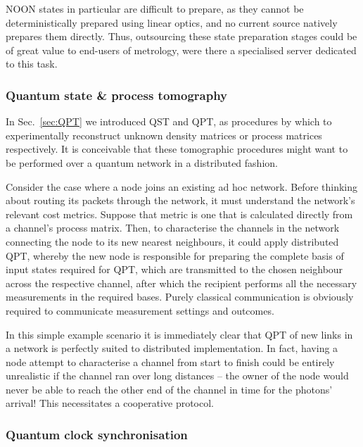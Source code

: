 \documentclass[aps, rmp, twocolumn, amsmath, amssymb, nofootinbib, superscriptaddress, longbibliography, floatfix, table-of-contents, eqsecnum]{revtex4-1}
\begin{document}
NOON states in particular are difficult to prepare, as they cannot be deterministically prepared using linear optics, and no current source natively prepares them directly. Thus, outsourcing these state preparation stages could be of great value to end-users of metrology, were there a specialised server dedicated to this task.

\cite{DomBerry}

%
%

\subsubsection{Quantum state \& process tomography}  

In Sec.~\ref{sec:QPT} we introduced QST and QPT, as procedures by which to experimentally reconstruct unknown density matrices or process matrices respectively. It is conceivable that these tomographic procedures might want to be performed over a quantum network in a distributed fashion.

Consider the case where a node joins an existing ad hoc network. Before thinking about routing its packets through the network, it must understand the network's relevant cost metrics. Suppose that metric is one that is calculated directly from a channel's process matrix. Then, to characterise the channels in the network connecting the node to its new nearest neighbours, it could apply distributed QPT, whereby the new node is responsible for preparing the complete basis of input states required for QPT, which are transmitted to the chosen neighbour across the respective channel, after which the recipient performs all the necessary measurements in the required bases. Purely classical communication is obviously required to communicate measurement settings and outcomes.

In this simple example scenario it is immediately clear that QPT of new links in a network is perfectly suited to distributed implementation. In fact, having a node attempt to characterise a channel from start to finish could be entirely unrealistic if the channel ran over long distances -- the owner of the node would never be able to reach the other end of the channel in time for the photons' arrival! This necessitates a cooperative protocol.

%
%

\subsubsection{Quantum clock synchronisation} 
\end{document}
